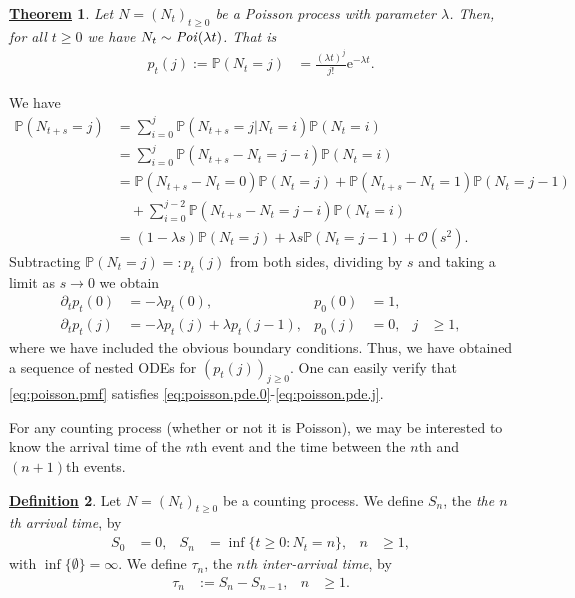 \documentclass[12pt]{book}
\numberwithin{equation}{chapter}
\theoremstyle{plain}
\newtheorem{theorem}{\underline{Theorem}}
\numberwithin{theorem}{section}
\theoremstyle{definition}
\newtheorem{definition}[theorem]{\underline{Definition}}
\numberwithin{exercise}{chapter}
\let\oldendproof\endproof
\renewenvironment{proof}[1][\proofname]{%
  \oldproof[\scshape\underline{#1}]%
}{\oldendproof}
\newcommand{\<}{\langle}
\renewcommand{\>}{\rangle}
\renewcommand{\(}{\left(}
\renewcommand{\)}{\right)}
\renewcommand{\[}{\left[}
\renewcommand{\]}{\right]}
\newcommand\Pb{\mathds{P}}
\newcommand\Oc{\mathscr{O}}
\newcommand\lam{\lambda}
\renewcommand\d{\partial}
\newcommand\ee{\mathrm{e}}
\begin{document}
\begin{theorem}
Let $N = (N_t)_{t \geq 0}$ be a Poisson process with parameter $\lam$.
Then, for all $t \geq 0$ we have $N_t \sim \text{\emph{Poi}}(\lam t)$.  That is
\begin{align}
p_t(j) := \Pb( N_t = j )
	&=	\frac{(\lam t)^j}{j!} \ee^{- \lam t} . \label{eq:poisson.pmf}
\end{align}
\end{theorem}

\begin{proof}
We have
\begin{align}
\Pb( N_{t+s} = j )
	&=	\sum_{i=0}^j \Pb(N_{t+s} = j | N_t = i ) \Pb( N_t = i ) \\
	&=	\sum_{i=0}^j \Pb(N_{t+s} - N_t = j - i ) \Pb( N_t = i ) \\
	&=	\Pb(N_{t+s} - N_t = 0  ) \Pb( N_t = j ) + \Pb(N_{t+s} - N_t = 1  ) \Pb( N_t = j-1 ) \\ &\quad 
			+ \sum_{i=0}^{j-2} \Pb(N_{t+s} - N_t = j - i ) \Pb( N_t = i ) \\
	&=	( 1 - \lam s ) \Pb( N_t = j ) + \lam s \Pb( N_t = j-1 ) + \Oc(s^2) .
\end{align}
Subtracting $\Pb( N_t = j )=:p_t(j)$ from both sides, dividing by $s$ and taking a limit as $s \to 0$ we obtain
\begin{align}
\d_t p_t(0)
	&=	- \lam p_t(0) , &
p_0(0)
	&=	1 , \label{eq:poisson.pde.0} \\
\d_t p_t(j)
	&=	- \lam p_t(j)  + \lam p_t(j-1) , &
p_0(j)
	&=	0 , &
j
	&\geq 1 , \label{eq:poisson.pde.j}
\end{align}
where we have included the obvious boundary conditions.
Thus, we have obtained a sequence of nested ODEs for $(p_t(j))_{j \geq 0}$.  
One can easily verify that \eqref{eq:poisson.pmf} satisfies \eqref{eq:poisson.pde.0}-\eqref{eq:poisson.pde.j}.
\end{proof}

For any counting process (whether or not it is Poisson), we may be interested to know the arrival time of the $n$th event and the time between the $n$th and $(n+1)$th events.

\begin{definition}
\label{def:inter-arrival}
Let $N = (N_t)_{t \geq 0}$ be a counting process.  We define $S_n$, the \emph{the $n$th arrival time}, by
\begin{align}
S_0
	&=	0 , &
S_n
	&=	\inf\{ t \geq 0 : N_t = n \} , &
n
	&\geq 1 , \label{eq:S.def}
\end{align}
with $\inf\{ \emptyset \} = \infty$.
We define $\tau_n$, the \emph{$n$th inter-arrival time}, by
\begin{align}
\tau_n
	&:=	S_n - S_{n-1} , &
n
	&\geq 1 . \label{eq:tau.def}
\end{align}
\end{definition}
\end{document}
